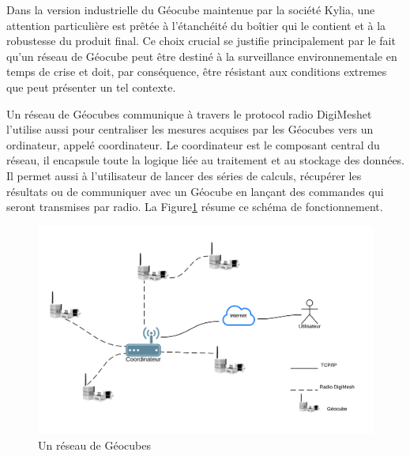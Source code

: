 \documentclass{themeensg}
\begin{document}
Dans la version industrielle du Géocube maintenue par la société Kylia, une attention particulière est prêtée à l'étanchéité du boîtier qui le contient et à la robustesse du produit final. Ce choix crucial se justifie principalement par le fait qu'un réseau de Géocube peut être destiné à la surveillance environnementale en temps de crise et doit, par conséquence, être résistant aux conditions extremes que peut présenter un tel contexte.

Un réseau de Géocubes communique à travers le protocol radio DigiMesh\textcopyright et l'utilise aussi pour centraliser les mesures acquises par les Géocubes vers un ordinateur, appelé coordinateur. Le coordinateur est le composant central du réseau, il encapsule toute la logique liée au traitement et au stockage des données. Il permet aussi à l'utilisateur de lancer des séries de calculs, récupérer les résultats ou de communiquer avec un Géocube en lançant des commandes qui seront transmises par radio. La Figure\ref{fig:geocube_network} résume ce schéma de fonctionnement.

\begin{figure}[h!]
\centering
\includegraphics[scale=0.8]{images/fig1.png}
\caption{Un réseau de Géocubes}
\label{fig:geocube_network}
\end{figure}
\end{document}
